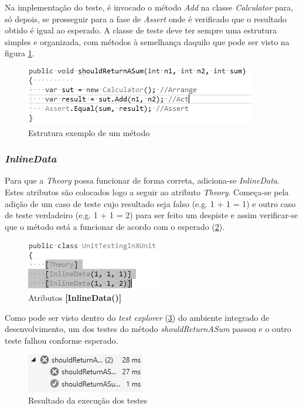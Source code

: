 \hspace{1cm}Na implementação do teste, é invocado o método \textit{Add} na classe \textit{Calculator} para, só depois, se prosseguir para a fase de \textit{Assert} onde é verificado que o resultado obtido é igual ao esperado. A classe de teste deve ter sempre uma estrutura simples e organizada, com métodos à semelhança daquilo que pode ser visto na figura \ref{Fig:Fig17}. 

\begin{figure}[hbt!]
\centering
\includegraphics[width=0.5\linewidth]{Cap5/XUnitClassStructure.png}
\caption{Estrutura exemplo de um método}
\label{Fig:Fig17}
\end{figure}

\subsubsection{\textit{InlineData}}

\hspace{1cm}Para que a \textit{Theory} possa funcionar de forma correta, adiciona-se \textit{InlineData}. Estes atributos são colocados logo a seguir ao atributo \textit{Theory}. Começa-se pela adição de um caso de teste cujo resultado seja falso (e.g. 1 + 1 = 1) e outro caso de teste verdadeiro (e.g. 1 + 1 = 2) para ser feito um despiste e assim verificar-se que o método está a funcionar de acordo com o esperado (\ref{Fig:Fig18}).
 
 \begin{figure}[hbt!]
\centering
\includegraphics[width=0.3\linewidth]{Cap5/XUnitInlineData.png}
\caption{Atributos \textbf{[InlineData()]}}
\label{Fig:Fig18}
\end{figure}


\hspace{1cm}Como pode ser visto dentro do \textit{test explorer} (\ref{Fig:Fig19})
do ambiente integrado de desenvolvimento, um dos testes do método \textit{shouldReturnASum} passou e o outro teste falhou conforme esperado.

 \begin{figure}[hbt!]
\centering
\includegraphics[width=0.3\linewidth]{Cap5/XUnitTestResults1.png}
\caption{Resultado da execução dos testes}
\label{Fig:Fig19}
\end{figure}

